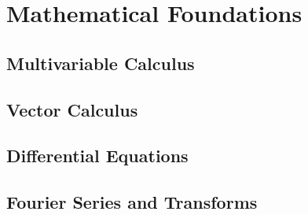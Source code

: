 \chapter{Mathematical Foundations}

\section{Multivariable Calculus}
\TODO

\section{Vector Calculus}
\TODO

\section{Differential Equations}
\TODO

\section{Fourier Series and Transforms}
\TODO
